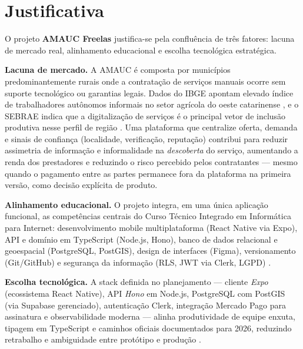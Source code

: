 \documentclass[12pt, a4paper]{article}
\begin{document}
\section{Justificativa}

O projeto \textbf{AMAUC Freelas} justifica-se pela confluência de três fatores:
lacuna de mercado real, alinhamento educacional e escolha tecnológica
estratégica.

\textbf{Lacuna de mercado.} A AMAUC é composta por municípios
predominantemente rurais onde a contratação de serviços manuais ocorre
sem suporte tecnológico ou garantias legais. Dados do IBGE apontam
elevado índice de trabalhadores autônomos informais no setor agrícola do
oeste catarinense \cite{ibge2019}, e o SEBRAE indica que a digitalização
de serviços é o principal vetor de inclusão produtiva nesse perfil de
região \cite{sebrae2022}. Uma plataforma que centralize oferta, demanda
e sinais de confiança (localidade, verificação, reputação) contribui
para reduzir assimetria de informação e informalidade na \textit{descoberta}
do serviço, aumentando a renda dos prestadores e reduzindo o risco percebido
pelos contratantes --- mesmo quando o pagamento entre as partes permanece
fora da plataforma na primeira versão, como decisão explícita de produto.

\textbf{Alinhamento educacional.} O projeto integra, em uma única
aplicação funcional, as competências centrais do Curso Técnico Integrado
em Informática para Internet: desenvolvimento mobile multiplataforma
(React Native via Expo), API e domínio em TypeScript (Node.js, Hono),
banco de dados relacional e geoespacial (PostgreSQL, PostGIS),
design de interfaces (Figma), versionamento (Git/GitHub) e segurança
da informação (RLS, JWT via Clerk, LGPD) \cite{sommerville2019, pressman2016}.

\textbf{Escolha tecnológica.} A stack definida no planejamento --- cliente
\textit{Expo} (ecossistema React Native), API \textit{Hono} em Node.js,
PostgreSQL com PostGIS (via Supabase gerenciado), autenticação Clerk,
integração Mercado Pago para assinatura e observabilidade moderna ---
alinha produtividade de equipe enxuta, tipagem em TypeScript e caminhos
oficiais documentados para 2026, reduzindo retrabalho e ambiguidade entre
protótipo e produção \cite{react2024, postgresql2024}.

\end{document}
